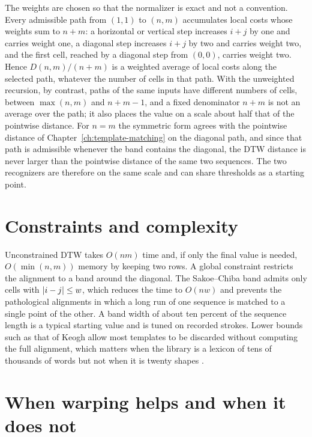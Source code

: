 The weights are chosen so that the normalizer is exact and not a convention. Every admissible path from $(1,1)$ to $(n,m)$ accumulates local costs whose weights sum to $n+m$: a horizontal or vertical step increases $i+j$ by one and carries weight one, a diagonal step increases $i+j$ by two and carries weight two, and the first cell, reached by a diagonal step from $(0,0)$, carries weight two. Hence $D(n,m)/(n+m)$ is a weighted average of local costs along the selected path, whatever the number of cells in that path. With the unweighted recursion, by contrast, paths of the same inputs have different numbers of cells, between $\max(n,m)$ and $n+m-1$, and a fixed denominator $n+m$ is not an average over the path; it also places the value on a scale about half that of the pointwise distance. For $n=m$ the symmetric form agrees with the pointwise distance of Chapter~\ref{ch:template-matching} on the diagonal path, and since that path is admissible whenever the band contains the diagonal, the DTW distance is never larger than the pointwise distance of the same two sequences.\evD{} The two recognizers are therefore on the same scale and can share thresholds as a starting point.

\section{Constraints and complexity}

Unconstrained DTW takes $O(nm)$ time and, if only the final value is needed, $O(\min(n,m))$ memory by keeping two rows. A global constraint restricts the alignment to a band around the diagonal. The Sakoe--Chiba band admits only cells with $\lvert i-j\rvert\le w$, which reduces the time to $O(nw)$ and prevents the pathological alignments in which a long run of one sequence is matched to a single point of the other.\evD{} A band width of about ten percent of the sequence length is a typical starting value and is tuned on recorded strokes. Lower bounds such as that of Keogh allow most templates to be discarded without computing the full alignment, which matters when the library is a lexicon of tens of thousands of words but not when it is twenty shapes \cite{keogh2005}.\evD{}

\section{When warping helps and when it does not}


